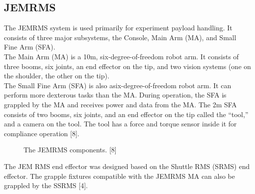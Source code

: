 \documentclass[a4paper,12pt,oneside]{report}
\begin{document}
\subsection{JEMRMS}
The JEMRMS system is used primarily for experiment payload handling. It consists of three major subsystems, the
Console, Main Arm (MA), and Small Fine Arm (SFA).\\
The Main Arm (MA) is a 10m, six-degree-of-freedom robot arm. It consists of three booms, six joints, an end effector on the tip, and two vision systems (one on the shoulder, the other on the tip).\\
The Small Fine Arm (SFA) is also asix-degree-of-freedom robot arm. It can perform more dexterous tasks than the MA. During operation, the SFA is grappled by the MA and receives power and data from the MA. The 2m SFA consists of two booms, six joints, and an end effector on the tip called the “tool,” and a camera on the tool. The tool has a force and torque sensor inside it for compliance operation [8].\\
\begin{figure}[h]
  \centering
   \quad
{} 
  \caption{The JEMRMS components. [8]}
  \label{JEMRMS_components}
\end{figure}
The JEM RMS end effector was designed based on the Shuttle RMS (SRMS) end effector. The grapple fixtures compatible with the JEMRMS MA can also be grappled by the SSRMS [4].
\newpage
\end{document}
